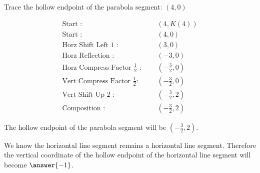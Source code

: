 \documentclass{ximera}
\begin{document}
\begin{question} 



Trace the hollow endpoint of the parabola segment: $(4, 0)$





\begin{align*}
\text{Start :} & \text{  } & (4, K(4))  \\
\text{Start :} & \text{  } & (4, 0) \\
\text{Horz Shift Left $1$ :} & \text{  } & \left( 3, 0 \right)   \\
\text{Horz Reflection :} & \text{  } & \left( -3, 0 \right)   \\
\text{Horz Compress Factor $\tfrac{1}{2}$ :}  & \text{  } & \left( -\frac{3}{2}, 0 \right)   \\
\text{Vert Compress Factor $\tfrac{1}{2}$:} & \text{  } & \left( -\frac{3}{2}, 0 \right)   \\
\text{Vert Shift Up $2$ :} & \text{  } & \left( -\frac{3}{2}, 2 \right)   \\
\text{Composition :} & \text{  } & \left( -\frac{3}{2}, 2 \right)   
\end{align*}


The hollow endpoint of the parabola segment will be $\left( -\frac{3}{2}, 2 \right)$.

\end{question}
















\begin{question} 

We know the horizontal line segment remains a horizontal line segment. Therefore the vertical coordinate of the hollow endpoint of the horizontal line segment will become $\answer{-1}$.

\end{question}




  
\end{document}
